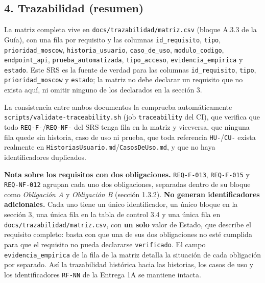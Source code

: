 \documentclass[
  spanish,
]{article}
\begin{document}
\subsection{4. Trazabilidad (resumen)}\label{trazabilidad-resumen}

La matriz completa vive en \texttt{docs/\allowbreak{}trazabilidad/\allowbreak{}matriz.\allowbreak{}csv} (bloque
A.3.3 de la Guía), con una fila por requisito y las columnas
\texttt{id\_\allowbreak{}requisito}, \texttt{tipo}, \texttt{prioridad\_\allowbreak{}moscow},
\texttt{historia\_\allowbreak{}usuario}, \texttt{caso\_\allowbreak{}de\_\allowbreak{}uso},
\texttt{modulo\_\allowbreak{}codigo}, \texttt{endpoint\_\allowbreak{}api},
\texttt{prueba\_\allowbreak{}automatiza\allowbreak{}da}, \texttt{tipo\_\allowbreak{}acceso},
\texttt{evidencia\_\allowbreak{}empiric\allowbreak{}a} y \texttt{estado}. Este SRS es la fuente de
verdad para las columnas \texttt{id\_\allowbreak{}requisito}, \texttt{tipo},
\texttt{prioridad\_\allowbreak{}moscow} y \texttt{estado}; la matriz no debe declarar
un requisito que no exista aquí, ni omitir ninguno de los declarados en
la sección 3.

La consistencia entre ambos documentos la comprueba automáticamente
\texttt{scripts/\allowbreak{}validate-\allowbreak{}traceability.\allowbreak{}sh} (job \texttt{traceability} del
CI), que verifica que todo \texttt{REQ-\allowbreak{}F-}/\texttt{REQ-\allowbreak{}NF-} del SRS
tenga fila en la matriz y viceversa, que ninguna fila quede sin
historia, caso de uso ni prueba, que toda referencia
\texttt{HU-}/\texttt{CU-} exista realmente en
\texttt{Historias\allowbreak{}Usuario.\allowbreak{}md}/\texttt{Casos\allowbreak{}De\allowbreak{}Uso.\allowbreak{}md}, y que no haya
identificadores duplicados.

\textbf{Nota sobre los requisitos con dos obligaciones.}
\texttt{REQ-\allowbreak{}F-\allowbreak{}013}, \texttt{REQ-\allowbreak{}F-\allowbreak{}015} y \texttt{REQ-\allowbreak{}NF-\allowbreak{}012} agrupan
cada uno dos obligaciones, separadas dentro de su bloque como
\emph{Obligación A} y \emph{Obligación B} (sección 1.3.2). \textbf{No
generan identificadores adicionales.} Cada uno tiene un único
identificador, un único bloque en la sección 3, una única fila en la
tabla de control 3.4 y una única fila en
\texttt{docs/\allowbreak{}trazabilidad/\allowbreak{}matriz.\allowbreak{}csv}, con \textbf{un solo} valor de
Estado, que describe el requisito completo: basta con que una de sus dos
obligaciones no esté cumplida para que el requisito no pueda declararse
\texttt{verificado}. El campo \texttt{evidencia\_\allowbreak{}empiric\allowbreak{}a} de la fila de
la matriz detalla la situación de cada obligación por separado. Así la
trazabilidad histórica hacia las historias, los casos de uso y los
identificadores \texttt{RF-\allowbreak{}NN} de la Entrega 1A se mantiene intacta.
\end{document}
